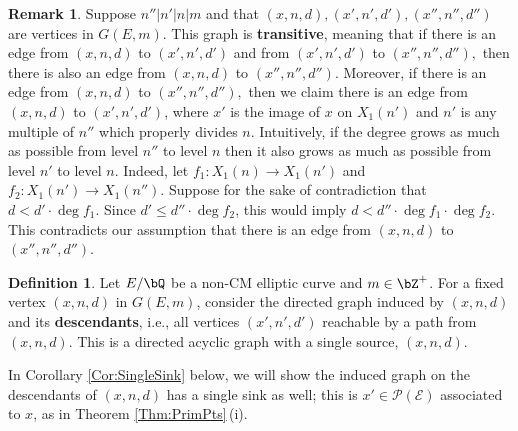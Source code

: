 \documentclass[11pt,reqno]{amsart}
\theoremstyle{plain}
\theoremstyle{definition}
\newtheorem{remark}[theorem]{Remark}
\newtheorem{definition}[theorem]{Definition}
\newcommand{\Q}{\bQ}
\newcommand{\Z}{\bZ}
\begin{document}
\begin{remark}\label{Remark:Transitivity}
Suppose $n'' | n' | n | m$ and that $(x,n,d), (x',n',d'), (x'',n'',d'')$ are vertices in $G(E,m)$. This graph is \textbf{transitive}, meaning that if there is an edge from $(x,n,d)$ to $(x',n',d')$ and from $(x',n',d')$ to $(x'',n'',d''),$ then
there is also an edge from $(x,n,d)$ to $(x'',n'',d'')$. Moreover, if there is an edge from $(x,n,d)$ to $(x'',n'',d''),$ then we  claim there is an edge from $(x,n,d)$ to $(x',n',d')$, where $x'$ is the image of $x$ on $X_1(n')$ and $n'$ is any multiple of $n''$ which properly divides $n$. Intuitively, if the degree grows as much as possible from level $n''$ to level $n$ then it also grows as much as possible from level $n'$ to level $n$. Indeed, let $f_1\colon X_1(n) \rightarrow X_1(n')$ and $f_2\colon X_1(n') \rightarrow X_1(n'')$. Suppose for the sake of contradiction that  $d<d'\cdot\deg f_1$. Since $d' \leq d'' \cdot \deg f_2$, this would imply $d<d'' \cdot\deg f_1\cdot \deg f_2$. This contradicts our assumption that there is an edge from $(x,n,d)$ to $(x'',n'',d'')$.
\end{remark}


\begin{definition}
Let $E/\Q$ be a non-CM elliptic curve and $m \in \Z^+$. For a fixed vertex $(x,n,d)$ in $G(E,m)$, consider the directed graph induced by $(x,n,d)$ and its \textbf{descendants}, i.e., all vertices $(x',n',d')$ reachable by a path from $(x,n,d)$. This is a directed acyclic graph with a single source, $(x,n,d)$.  
\end{definition}

In Corollary \ref{Cor:SingleSink} below, we will show the induced graph on the descendants of $(x,n,d)$ has a single sink as well; this is $x' \in \mathcal{P(E)}$ associated to $x$, as in Theorem \ref{Thm:PrimPts}\,(i).
\end{document}
